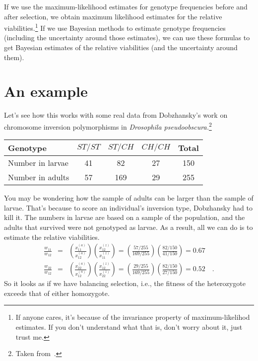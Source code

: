 If we use the maximum-likelihood estimates for genotype frequencies
before and after selection, we obtain maximum likelihood estimates for
the relative viabilities.\footnote{If anyone cares, it's because of
  the invariance property of maximum-likelihod estimates. If you don't
  understand what that is, don't worry about it, just trust me.} If we
use Bayesian methods to estimate genotype frequencies (including the
uncertainty around those estimates), we can use these formulas to get
Bayesian estimates of the relative viabilities (and the uncertainty
around them).

\section*{An example}

Let's see how this works with some real data from Dobzhansky's work on
chromosome inversion polymorphisms in {\it Drosophila
pseudoobscura.}\footnote{Taken from~\cite{Dobzhansky-1947}.}

\begin{center}
\begin{tabular}{l|ccc|c}
\hline\hline
Genotype & $ST/ST$ & $ST/CH$ & $CH/CH$ & Total \\
\hline
Number in larvae & 41 & 82 & 27 & 150 \\
Number in adults & 57 & 169 & 29 & 255 \\
\hline
\end{tabular}
\end{center}

You may be wondering how the sample of adults can be larger than the
sample of larvae. That's because to score an individual's inversion
type, Dobzhansky had to kill it. The numbers in larvae are based on a
sample of the population, and the adults that survived were not
genotyped as larvae. As a result, all we can do is to estimate the
relative viabilities.
\begin{eqnarray*}
\frac{w_{11}}{w_{12}} &=& \left(\frac{x_{11}^{(a)}}{x_{12}^{(a)}}\right)
                          \left(\frac{x_{12}^{(z)}}{x_{11}^{(z)}}\right)
= \left(\frac{57/255}{169/255}\right)
  \left(\frac{82/150}{41/150}\right)
= 0.67 \\
\frac{w_{22}}{w_{12}} &=& \left(\frac{x_{22}^{(a)}}{x_{12}^{(a)}}\right)
                          \left(\frac{x_{12}^{(z)}}{x_{22}^{(z)}}\right)
= \left(\frac{29/255}{169/255}\right)
  \left(\frac{82/150}{27/150}\right)
= 0.52 \quad .
\end{eqnarray*}
So it looks as if we have balancing selection, i.e., the fitness of
the heterozygote exceeds that of either homozygote.


